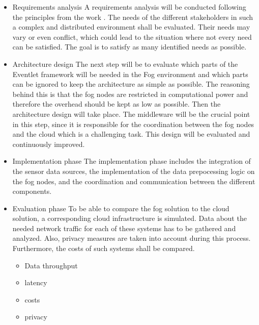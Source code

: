 \documentclass[draft,final,openany,oneside]{vutinfth} %
\begin{document}
\begin{itemize}
  \item Requirements analysis \newline
  A requirements analysis will be conducted following the principles from the work \cite{RequirementsEngineering}.  The needs of the different stakeholders in such a complex and distributed environment shall be evaluated. Their needs may vary or even conflict, which could lead to the situation where not every need can be satisfied. The goal is to satisfy as many identified needs as possible.  
  
  \item Architecture design \newline
  The next step will be to evaluate which parts of the Eventlet framework \cite{Appel2012} will be needed in the Fog environment and which parts can be ignored to keep the architecture as simple as possible. The reasoning behind this is that the fog nodes are restricted in computational power and therefore the overhead should be kept as low as possible.  \newline
Then the architecture design will take place. The middleware will be the crucial point in this step, since it is responsible for the coordination between the fog nodes and the cloud which is a challenging task. \cite{Appel2012} This design will be evaluated and continuously improved.
  
  \item Implementation phase \newline
  The implementation phase includes the integration of the sensor data sources, the implementation of the data prepocessing logic on the fog nodes, and the coordination and communication between the different components.
  
  \item Evaluation phase \newline
  To be able to compare the fog solution to the cloud solution, a corresponding cloud infrastructure is simulated. Data about the needed network traffic for each of these systems has to be gathered and analyzed. Also, privacy measures are taken into account during this process. Furthermore, the costs of such systems shall be compared. 
  \begin{itemize}
      \item Data throughput
      \item latency 
      \item costs 
      \item privacy
  \end{itemize}
\end{itemize}
\end{document}
